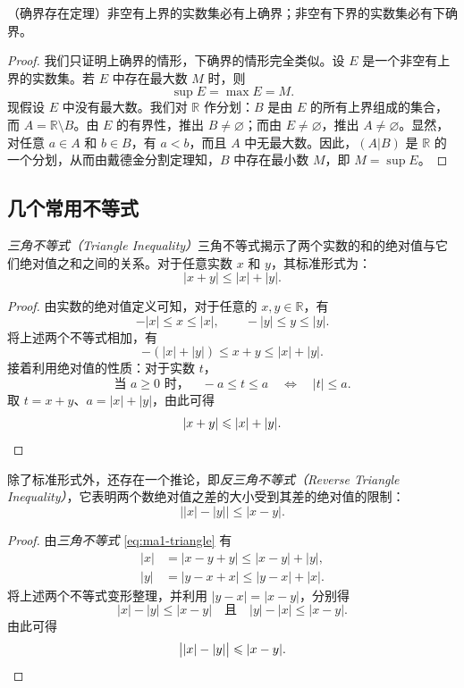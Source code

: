 \documentclass[UTF8,12pt,a4paper,fontset=fandol]{ctexbook}
\begin{document}
\begin{theorem}
（确界存在定理）非空有上界的实数集必有上确界；非空有下界的实数集必有下确界。


\begin{proof}
我们只证明上确界的情形，下确界的情形完全类似。设 $E$ 是一个非空有上界的实数集。若 $E$ 中存在最大数 $M$ 时，则
\[
  \sup E=\max E=M.
\]
现假设 $E$ 中没有最大数。我们对 $\mathbb{R}$ 作分划：$B$ 是由 $E$ 的所有上界组成的集合，而 $A=\mathbb{R}\setminus B$。由 $E$ 的有界性，推出 $B\ne\varnothing$；而由 $E\ne\varnothing$，推出 $A\ne\varnothing$。显然，对任意 $a\in A$ 和 $b\in B$，有 $a<b$，而且 $A$ 中无最大数。因此，$(A|B)$ 是 $\mathbb{R}$ 的一个分划，从而由戴德金分割定理知，$B$ 中存在最小数 $M$，即 $M=\sup E$。
\end{proof}
\end{theorem}


\subsection{几个常用不等式}
\emph{三角不等式（Triangle Inequality）}\quad 三角不等式揭示了两个实数的和的绝对值与它们绝对值之和之间的关系。对于任意实数 $x$ 和 $y$，其标准形式为：
\begin{equation}
  \label{eq:ma1-triangle}
  |x+y|\leqslant |x|+|y|.
\end{equation}


\begin{proof}
由实数的绝对值定义可知，对于任意的 $x,y\in\mathbb{R}$，有
\[
  -|x|\leqslant x\leqslant |x|,\qquad -|y|\leqslant y\leqslant |y|.
\]
将上述两个不等式相加，有
\[
  -(|x|+|y|)\leqslant x+y\leqslant |x|+|y|.
\]
接着利用绝对值的性质：对于实数 $t$，
\[
  \text{当 }a\geqslant0\text{ 时，}\quad
  -a\leqslant t\leqslant a\quad\Longleftrightarrow\quad |t|\leqslant a.
\]
取 $t=x+y$、$a=|x|+|y|$，由此可得
\[
  |x+y|\leqslant |x|+|y|.\qedhere
\]
\end{proof}


除了标准形式外，还存在一个推论，即\emph{反三角不等式（Reverse Triangle Inequality）}，它表明两个数绝对值之差的大小受到其差的绝对值的限制：
\begin{equation}
  \label{eq:ma1-reverse-triangle}
  \bigl||x|-|y|\bigr|\leqslant |x-y|.
\end{equation}


\begin{proof}
由\emph{三角不等式} \eqref{eq:ma1-triangle} 有
\[
\begin{aligned}
  |x|&=|x-y+y|\leqslant |x-y|+|y|,\\
  |y|&=|y-x+x|\leqslant |y-x|+|x|.
\end{aligned}
\]
将上述两个不等式变形整理，并利用 $|y-x|=|x-y|$，分别得
\[
  |x|-|y|\leqslant |x-y|\quad\text{且}\quad |y|-|x|\leqslant |x-y|.
\]
由此可得
\[
  \bigl||x|-|y|\bigr|\leqslant |x-y|.\qedhere
\]
\end{proof}
\end{document}
